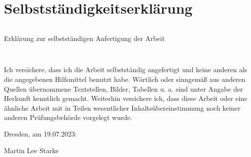 \section*{Selbstständigkeitserklärung }
\thispagestyle{empty}

\begin{verbatim}

\end{verbatim}

\begin{LARGE}Erklärung zur selbstständigen Anfertigung der Arbeit \end{LARGE}
\begin{verbatim}


\end{verbatim}
Ich versichere, dass ich die Arbeit selbstständig angefertigt und keine anderen als die angegebenen Hilfsmittel benutzt habe. Wörtlich oder sinngemäß aus anderen Quellen übernommene Textstellen, Bilder, Tabellen u. a. sind unter Angabe der Herkunft kenntlich gemacht. Weiterhin versichere ich, dass diese Arbeit oder eine ähnliche Arbeit mit in Teilen wesentlicher Inhaltsübereinstimmung noch keiner anderen Prüfungsbehörde vorgelegt wurde.





\begin{flushleft}Dresden, am 19.07.2023:\end{flushleft} 
\begin{flushright}Martin Lee Starke\end{flushright}


